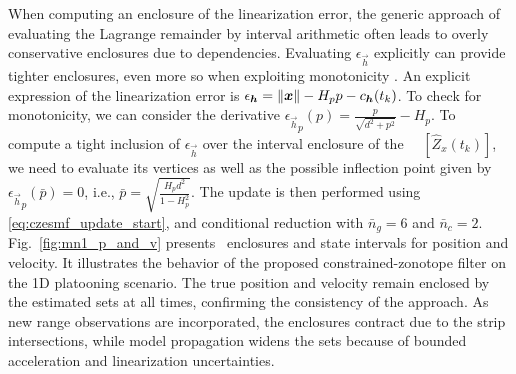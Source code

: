 \documentclass{ifacconf}
\begin{document}
When computing an enclosure of the linearization error, the generic approach of evaluating the Lagrange remainder \citep{scholte2003nonlinear} by interval arithmetic often leads to overly conservative enclosures due to dependencies. Evaluating $\epsilon_{\vec{h}}$ explicitly can provide tighter enclosures, even more so when exploiting monotonicity \citep{Bolting2018b}. An explicit expression of the linearization error is
${\epsilon_{\boldsymbol{h}} =
\lVert\boldsymbol{x}\rVert
-
H_p
p
- c_{\boldsymbol{h}}(t_k)}$.
To check for monotonicity, we can consider the derivative
${{\epsilon_{\vec{h}}}_{p}(p)
=
\frac{p}{\sqrt{d^2 + p^2}}
-
H_p}$.
To compute a tight inclusion of $\epsilon_{\vec{h}}$ over the interval enclosure of the \apriori\ \cz\ $\left[ \hat{Z}_x(t_k) \right]$, we need to evaluate its vertices as well as the possible inflection point given by
${\epsilon_{\vec{h}}}_{p}(\bar{p})
=
0$, i.e.,
 $\bar{p}
=
\sqrt{
	\frac{
H_p d^2
}{
1 - H_p^2
}
}$.
The update is then performed using \eqref{eq:czesmf_update_start},
and conditional reduction with $\bar{n}_g = 6$ and $\bar{n}_c = 2$.\\
Fig.~\ref{fig:mn1_p_and_v} presents \cz\ enclosures and state intervals for position and velocity. It illustrates the behavior of the proposed constrained-zonotope filter on the 1D platooning scenario. The true position and velocity remain enclosed by the estimated sets at all times, confirming the consistency of the approach. As new range observations are incorporated, the enclosures contract due to the strip intersections, while model propagation widens the sets because of bounded acceleration and linearization uncertainties.
\end{document}
